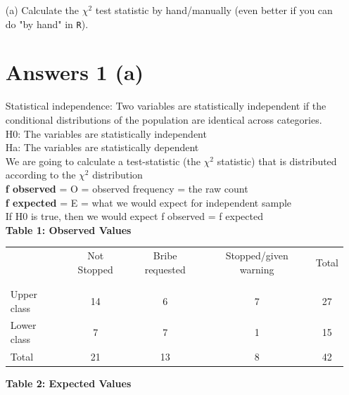 \documentclass[12pt,letterpaper]{article}
\begin{document}
\begin{enumerate}
	
	\item [(a)]
	Calculate the $\chi^2$ test statistic by hand/manually (even better if you can do "by hand" in \texttt{R}).\\

\section*{Answers 1 (a)}
\noindent Statistical independence: Two variables are statistically independent if the conditional distributions of the population are identical across categories.\\

\noindent H0: The variables are statistically independent\\
Ha: The variables are statistically dependent\\

\noindent We are going to calculate a test-statistic (the $\chi^2$ statistic) that is distributed according to the $\chi^2$ distribution \\

\textbf{f observed} = O = observed frequency = the raw count \\

\textbf{f expected} = E = what we would expect for independent sample \\ 

\noindent If H0 is true, then we would expect f observed = f expected \\

\textbf{Table 1: Observed Values}

\begin{table}[h!]
	\centering
	\begin{tabular}{l | c c c c }
		& Not Stopped & Bribe requested & Stopped/given warning & Total \\
		\\[-1.8ex] 
		\hline \\[-1.8ex]
		Upper class & 14 & 6 & 7 & 27 \\
		Lower class & 7 & 7 & 1 & 15 \\
		\hline
		Total & 21 & 13 & 8 & 42 \\
		\hline
	\end{tabular}
\end{table}

\newpage

\textbf{Table 2: Expected Values} \\


\end{enumerate}
\end{document}
